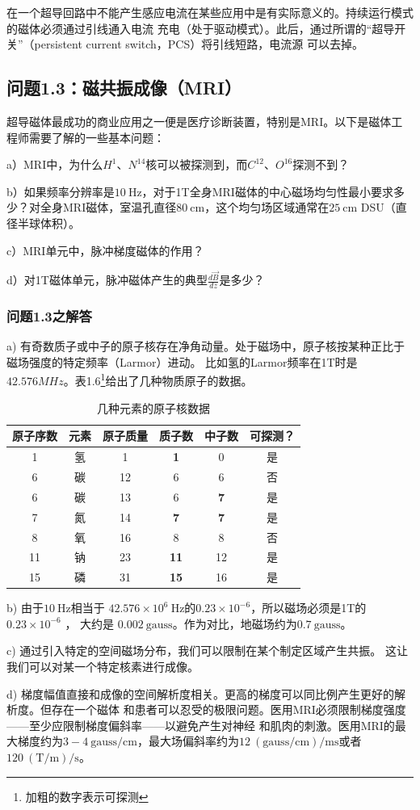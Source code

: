 在一个超导回路中不能产生感应电流在某些应用中是有实际意义的。持续运行模式的磁体必须通过引线通入电流
充电（处于驱动模式）。此后，通过所谓的“超导开关”（persistent current switch，PCS）将引线短路，电流源
可以去掉。


\subsection{问题1.3：磁共振成像（MRI）}
超导磁体最成功的商业应用之一便是医疗诊断装置，特别是MRI。以下是磁体工程师需要了解的一些基本问题：

a）MRI中，为什么$H^1$、$N^{14}$核可以被探测到，而$C^{12}$、$O^{16}$探测不到？

b）如果频率分辨率是$10\ \mathrm{Hz}$，对于1T全身MRI磁体的中心磁场均匀性最小要求多少？对全身MRI磁体，室温孔直径$80\ \mathrm{cm}$，这个均匀场区域通常在$25\ \mathrm{cm}$ DSU（直径半球体积）。

c）MRI单元中，脉冲梯度磁体的作用？

d）对1T磁体单元，脉冲磁体产生的典型$\frac{d\vec{B}}{dz}$是多少？

\subsubsection{问题1.3之解答}
a) 有奇数质子或中子的原子核存在净角动量。处于磁场中，原子核按某种正比于磁场强度的特定频率（Larmor）进动。
比如氢的Larmor频率在1T时是$42.576MHz$。表1.6\footnote{加粗的数字表示可探测}给出了几种物质原子的数据。
\begin{table}[htbp]\small
  \centering
  \caption{几种元素的原子核数据} \label{tb:atomic}
\begin{tabular}{|c||c|c|c|c|c|}
  \hline
原子序数&元素&原子质量&质子数&中子数&可探测？ \\ \hline \hline
1&氢&1&\textbf{1}&0&是 \\ \hline
6&碳&12&6&6&否 \\ \hline
6&碳&13&6&\textbf{7}&是 \\ \hline
7&氮&14&\textbf{7}&\textbf{7}&是 \\ \hline
8&氧&16&8&8&否 \\ \hline
11&钠&23&\textbf{11}&12&是 \\ \hline
15&磷&31&\textbf{15}&16&是 \\ \hline
\end{tabular}
\end{table}

b) 由于$10\ \mathrm{Hz}$相当于 $42.576×10^6\ \mathrm{Hz}$的$0.23×10^{−6}$，所以磁场必须是1T的$0.23×10^{−6}$ ，
大约是 $0.002\ \mathrm{gauss}$。作为对比，地磁场约为$0.7 \ \mathrm{gauss}$。

c) 通过引入特定的空间磁场分布，我们可以限制在某个制定区域产生共振。
这让我们可以对某一个特定核素进行成像。

d) 梯度幅值直接和成像的空间解析度相关。更高的梯度可以同比例产生更好的解析度。但存在一个磁体
和患者可以忍受的极限问题。医用MRI必须限制梯度强度——至少应限制梯度偏斜率——以避免产生对神经
和肌肉的刺激。医用MRI的最大梯度约为$3-4 \ \mathrm{gauss/cm}$，最大场偏斜率约为$12\ \mathrm{(gauss/cm)/ms}$或者
$120\ \mathrm{(T/m)/s}$。

